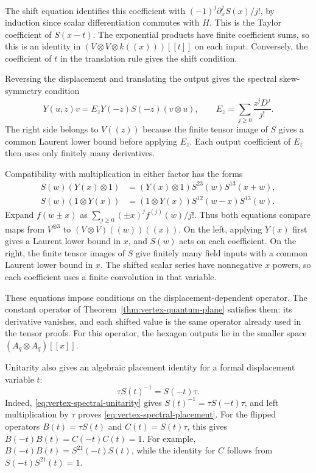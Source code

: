 The shift equation identifies this coefficient with
$(-1)^j\partial_x^jS(x)/j!$, by induction since scalar differentiation
commutes with $H$.
This is the Taylor coefficient of $S(x-t)$.
The exponential products have finite coefficient sums, so this is
an identity in $(V\otimes V\otimes k((x)))[[t]]$ on each input.
Conversely, the coefficient of $t$ in the translation rule gives
the shift condition.

Reversing the displacement and translating the output gives the
spectral skew-symmetry condition
\[
 Y(u,z)v=E_zY(-z)S(-z)(v\otimes u),\qquad
 E_z=\sum_{j\geq0}\frac{z^jD^j}{j!}.
\]
The right side belongs to $V((z))$ because the finite tensor
image of $S$ gives a common Laurent lower bound before applying $E_z$.
Each output coefficient of $E_z$ then uses only finitely many derivatives.

Compatibility with multiplication in either factor has the forms
\begin{align}
 S(w)(Y(x)\otimes1)
   &=(Y(x)\otimes1)S^{23}(w)S^{13}(x+w),
 \label{eq:vertex-spectral-hexagon-one}\\
 S(w)(1\otimes Y(x))
   &=(1\otimes Y(x))S^{12}(w-x)S^{13}(w).
 \label{eq:vertex-spectral-hexagon-two}
\end{align}
Expand $f(w\pm x)$ as
$\sum_{j\geq0}(\pm x)^jf^{(j)}(w)/j!$.
Thus both equations compare maps from $V^{\otimes3}$ to
$(V\otimes V)((w))((x))$.
On the left, applying $Y(x)$ first gives a Laurent lower
bound in $x$, and $S(w)$ acts on each coefficient.
On the right, the finite tensor images of $S$ give finitely
many field inputs with a common Laurent lower bound in $x$.
The shifted scalar series have nonnegative $x$ powers, so each
coefficient uses a finite convolution in that variable.

These equations impose conditions on the displacement-dependent operator.
The constant operator of Theorem~\ref{thm:vertex-quantum-plane}
satisfies them: its derivative vanishes, and each shifted value is
the same operator already used in the tensor proofs.
For this operator, the hexagon outputs lie in the smaller space
$(A_q\otimes A_q)[[x]]$.

Unitarity also gives an algebraic placement identity for a formal
displacement variable $t$:
\begin{equation}\label{eq:vertex-spectral-placement}
 \tau S(t)^{-1}=S(-t)\tau.
\end{equation}
Indeed, \eqref{eq:vertex-spectral-unitarity} gives
$S(t)^{-1}=\tau S(-t)\tau$, and left multiplication by $\tau$
proves \eqref{eq:vertex-spectral-placement}.
For the flipped operators $B(t)=\tau S(t)$ and $C(t)=S(t)\tau$,
this gives $B(-t)B(t)=C(-t)C(t)=1$.
For example, $B(-t)B(t)=S^{21}(-t)S(t)$, while the identity
for $C$ follows from $S(-t)S^{21}(t)=1$.

